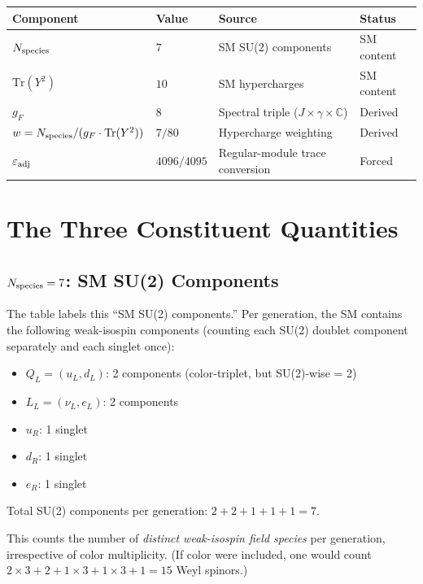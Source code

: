 \documentclass[11pt]{article}
\begin{document}
\begin{center}
\renewcommand{\arraystretch}{1.2}
\begin{tabular}{llll}
\toprule
Component & Value & Source & Status \\
\midrule
$N_{\rm species}$ & $7$ & SM SU(2) components & SM content \\
$\mathrm{Tr}(Y^2)$ & $10$ & SM hypercharges & SM content \\
$g_F$ & $8$ & Spectral triple ($J \times \gamma \times \mathbb{C}$) & Derived \\
$w = N_{\rm species}/(g_F \cdot \mathrm{Tr}(Y^2))$ & $7/80$ & Hypercharge weighting & Derived \\
$\varepsilon_{\rm adj}$ & $4096/4095$ & Regular-module trace conversion & Forced \\
\bottomrule
\end{tabular}
\end{center}

\section{The Three Constituent Quantities}

\subsection{$N_{\rm species} = 7$: SM SU(2) Components}

The table labels this ``SM SU(2) components.''  Per generation, the SM contains
the following weak-isospin components (counting each SU(2) doublet component
separately and each singlet once):
\begin{itemize}
\item $Q_L = (u_L, d_L)$: 2 components (color-triplet, but SU(2)-wise = 2)
\item $L_L = (\nu_L, e_L)$: 2 components
\item $u_R$: 1 singlet
\item $d_R$: 1 singlet
\item $e_R$: 1 singlet
\end{itemize}
Total SU(2) components per generation: $2 + 2 + 1 + 1 + 1 = 7$.

This counts the number of \emph{distinct weak-isospin field species} per
generation, irrespective of color multiplicity.  (If color were included, one
would count $2\times 3 + 2 + 1\times 3 + 1\times 3 + 1 = 15$ Weyl spinors.)
\end{document}
